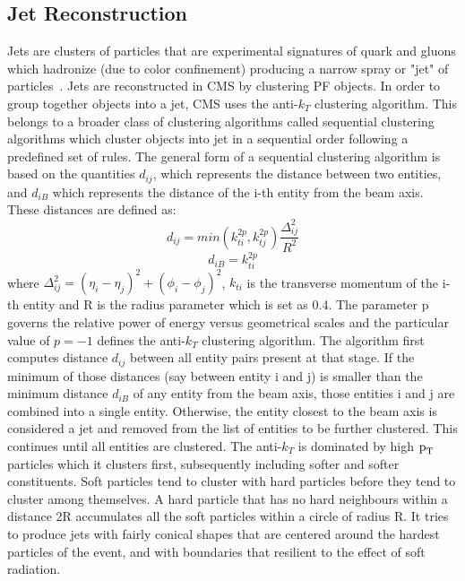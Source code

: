\subsection{Jet Reconstruction}
\label{jet_recon}
Jets are clusters of particles that are experimental signatures of quark and gluons which hadronize (due to color confinement) producing a narrow spray or "jet" of particles~\cite{jet_recon}. Jets are reconstructed in CMS by clustering PF objects. In order to group together objects into a jet, CMS uses the anti-$k_{T}$ clustering algorithm. This belongs to a broader class of clustering algorithms called sequential clustering algorithms which cluster objects into jet in a sequential order following a predefined set of rules. The general form of a sequential clustering algorithm is based on the quantities  $d_{ij}$, which represents the distance between two entities, and $d_{iB}$ which represents the distance of the i-th entity from the beam axis. These distances are defined as:
\begin{equation*}
  d_{ij}=min(k_{ti}^{2p},k_{tj}^{2p})\frac{\Delta_{ij}^{2}}{R^2}
\end{equation*}
\begin{equation*}
  d_{iB}=k_{ti}^{2p}
\end{equation*}
where $\Delta_{ij}^{2}=(\eta_i-\eta_j)^2+(\phi_i-\phi_j)^2$, $k_{ti}$ is the transverse momentum of the i-th entity and R is the radius parameter which is set as 0.4. The parameter p governs the relative power of energy versus geometrical scales and the particular value of $p=-1$ defines the anti-$k_{T}$ clustering algorithm. The algorithm first computes distance $d_{ij}$ between all entity pairs present at that stage. If the minimum of those distances (say between entity i and j) is smaller than the minimum distance $d_{iB}$ of any entity from the beam axis, those entities i and j are combined into a single entity. Otherwise, the entity closest to the beam axis is considered a jet and removed from the list of entities to be further clustered. This continues until all entities are clustered. The anti-$k_{T}$ is dominated by high $\text{p}_\text{T}$ particles which it clusters first, subsequently including softer and softer constituents. Soft particles tend to cluster with hard particles before they tend to cluster among themselves. A hard particle that has no hard neighbours within a distance 2R accumulates all the soft particles within a circle of radius R. It tries to produce jets with fairly conical shapes that are centered around the hardest particles of the event, and with boundaries that resilient to the effect of soft radiation.

